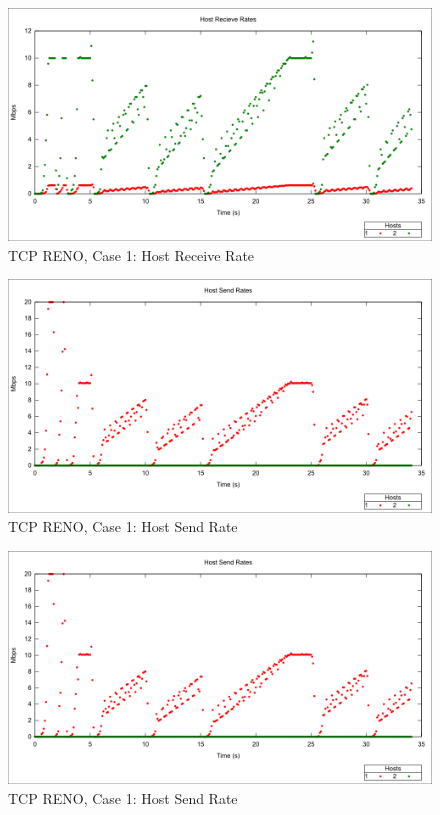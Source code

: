 \begin{figure}[htbp]
    \centering
    \includegraphics[width=\textwidth]{reno1/Host_Receive.png}
    \caption{TCP RENO, Case 1: Host Receive Rate}
\end{figure}


\begin{figure}[htbp]
    \centering
    \includegraphics[width=\textwidth]{reno1/Host_Send.png}
    \caption{TCP RENO, Case 1: Host Send Rate}
\end{figure}

\begin{figure}[htbp]
    \centering
    \includegraphics[width=\textwidth]{reno1/Host_Send.png}
    \caption{TCP RENO, Case 1: Host Send Rate}
\end{figure}


